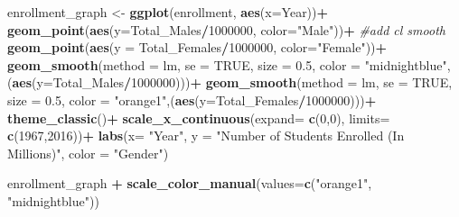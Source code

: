 \documentclass[]{article}
\newenvironment{Shaded}{\begin{snugshade}}{\end{snugshade}}
\newcommand{\KeywordTok}[1]{\textcolor[rgb]{0.13,0.29,0.53}{\textbf{#1}}}
\newcommand{\DataTypeTok}[1]{\textcolor[rgb]{0.13,0.29,0.53}{#1}}
\newcommand{\DecValTok}[1]{\textcolor[rgb]{0.00,0.00,0.81}{#1}}
\newcommand{\FloatTok}[1]{\textcolor[rgb]{0.00,0.00,0.81}{#1}}
\newcommand{\StringTok}[1]{\textcolor[rgb]{0.31,0.60,0.02}{#1}}
\newcommand{\CommentTok}[1]{\textcolor[rgb]{0.56,0.35,0.01}{\textit{#1}}}
\newcommand{\OtherTok}[1]{\textcolor[rgb]{0.56,0.35,0.01}{#1}}
\newcommand{\OperatorTok}[1]{\textcolor[rgb]{0.81,0.36,0.00}{\textbf{#1}}}
\newcommand{\NormalTok}[1]{#1}
\begin{document}
\begin{Shaded}
\begin{Highlighting}[]
\NormalTok{enrollment_graph <-}\StringTok{ }\KeywordTok{ggplot}\NormalTok{(enrollment, }\KeywordTok{aes}\NormalTok{(}\DataTypeTok{x=}\NormalTok{Year))}\OperatorTok{+}
\StringTok{  }\KeywordTok{geom_point}\NormalTok{(}\KeywordTok{aes}\NormalTok{(}\DataTypeTok{y=}\NormalTok{Total_Males}\OperatorTok{/}\DecValTok{1000000}\NormalTok{, }\DataTypeTok{color=}\StringTok{"Male"}\NormalTok{))}\OperatorTok{+}\StringTok{ }\CommentTok{#add cl smooth}
\StringTok{  }\KeywordTok{geom_point}\NormalTok{(}\KeywordTok{aes}\NormalTok{(}\DataTypeTok{y =}\NormalTok{ Total_Females}\OperatorTok{/}\DecValTok{1000000}\NormalTok{, }\DataTypeTok{color=}\StringTok{"Female"}\NormalTok{))}\OperatorTok{+}
\StringTok{  }\KeywordTok{geom_smooth}\NormalTok{(}\DataTypeTok{method =}\NormalTok{ lm, }\DataTypeTok{se =} \OtherTok{TRUE}\NormalTok{, }\DataTypeTok{size =} \FloatTok{0.5}\NormalTok{, }\DataTypeTok{color =} \StringTok{"midnightblue"}\NormalTok{,(}\KeywordTok{aes}\NormalTok{(}\DataTypeTok{y=}\NormalTok{Total_Males}\OperatorTok{/}\DecValTok{1000000}\NormalTok{)))}\OperatorTok{+}
\StringTok{  }\KeywordTok{geom_smooth}\NormalTok{(}\DataTypeTok{method =}\NormalTok{ lm, }\DataTypeTok{se =} \OtherTok{TRUE}\NormalTok{, }\DataTypeTok{size =} \FloatTok{0.5}\NormalTok{, }\DataTypeTok{color =} \StringTok{"orange1"}\NormalTok{,(}\KeywordTok{aes}\NormalTok{(}\DataTypeTok{y=}\NormalTok{Total_Females}\OperatorTok{/}\DecValTok{1000000}\NormalTok{)))}\OperatorTok{+}
\StringTok{  }\KeywordTok{theme_classic}\NormalTok{()}\OperatorTok{+}
\StringTok{  }\KeywordTok{scale_x_continuous}\NormalTok{(}\DataTypeTok{expand=} \KeywordTok{c}\NormalTok{(}\DecValTok{0}\NormalTok{,}\DecValTok{0}\NormalTok{), }\DataTypeTok{limits=} \KeywordTok{c}\NormalTok{(}\DecValTok{1967}\NormalTok{,}\DecValTok{2016}\NormalTok{))}\OperatorTok{+}
\StringTok{  }\KeywordTok{labs}\NormalTok{(}\DataTypeTok{x=} \StringTok{"Year"}\NormalTok{, }\DataTypeTok{y =} \StringTok{"Number of Students Enrolled (In Millions)"}\NormalTok{, }\DataTypeTok{color =} \StringTok{"Gender"}\NormalTok{)}

\NormalTok{enrollment_graph }\OperatorTok{+}\StringTok{ }\KeywordTok{scale_color_manual}\NormalTok{(}\DataTypeTok{values=}\KeywordTok{c}\NormalTok{(}\StringTok{"orange1"}\NormalTok{, }\StringTok{"midnightblue"}\NormalTok{))}
\end{Highlighting}
\end{Shaded}
\end{document}
